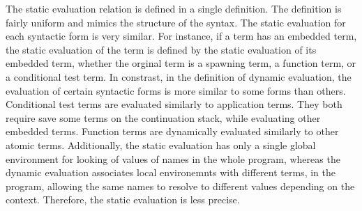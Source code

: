 \documentclass[letterpaper, 11pt]{extarticle}
\begin{document}
The static evaluation relation is defined in a single definition.
The definition is fairly uniform and mimics the structure of the syntax.
The static evaluation for each syntactic form is very similar.
For instance, if a term has an embedded term,
the static evaluation of the term is defined
by the static evaluation of its embedded term,
whether the orginal term is a spawning term, a function term, or a conditional test term.
In constrast, in the definition of dynamic evaluation,
the evaluation of certain syntactic forms is more similar to some forms than others.
Conditional test terms are evaluated similarly to application terms.  They both require
save some terms on the continuation stack, while evaluating other embedded terms.
Function terms are dynamically evaluated similarly to other atomic terms.
Additionally, the static evaluation has only a single global environment for
looking of values of names in the whole program, whereas the dynamic evaluation
associates local environemnts with different terms, in the program, allowing the same
names to resolve to different values depending on the context.  Therefore, the
static evaluation is less precise.
\end{document}
